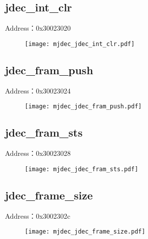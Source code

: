 \subsection{jdec\_int\_clr}
\label{mjdec-jdec-int-clr}
Address：0x30023020
 \begin{figure}[H]
\texttt{[image: mjdec\_jdec\_int\_clr.pdf]}
\end{figure}

\subsection{jdec\_fram\_push}
\label{mjdec-jdec-fram-push}
Address：0x30023024
 \begin{figure}[H]
\texttt{[image: mjdec\_jdec\_fram\_push.pdf]}
\end{figure}

\subsection{jdec\_fram\_sts}
\label{mjdec-jdec-fram-sts}
Address：0x30023028
 \begin{figure}[H]
\texttt{[image: mjdec\_jdec\_fram\_sts.pdf]}
\end{figure}

\subsection{jdec\_frame\_size}
\label{mjdec-jdec-frame-size}
Address：0x3002302c
 \begin{figure}[H]
\texttt{[image: mjdec\_jdec\_frame\_size.pdf]}
\end{figure}

